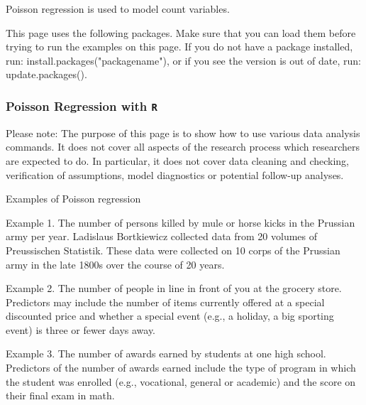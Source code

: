 \documentclass[00-GLMregslides.tex]{subfiles}
\begin{document}
\begin{frame}

Poisson regression is used to model count variables.

This page uses the following packages. Make sure that you can load them before trying to run the examples on this page. 
If you do not have a package installed, run: install.packages("packagename"), or if you see the version is out of date, run: update.packages().
 


% 
\end{frame}

\begin{frame}[fragile]

\frametitle{Poisson Regression with \texttt{R}}
\Large 
Please note: The purpose of this page is to show how to use various data analysis commands. It does not cover all aspects of the research process which researchers are expected to do. In particular, it does not cover data cleaning and checking, verification of assumptions, model diagnostics or potential follow-up analyses.
\end{frame}

\begin{frame}[fragile]
Examples of Poisson regression

Example 1. The number of persons killed by mule or horse kicks in the Prussian army per year. Ladislaus Bortkiewicz collected data from 20 volumes of Preussischen Statistik. These data were collected on 10 corps of the Prussian army in the late 1800s over the course of 20 years.
 
Example 2. The number of people in line in front of you at the grocery store. Predictors may include the number of items currently offered at a special discounted price and whether a special event (e.g., a holiday, a big sporting event) is three or fewer days away.
 
Example 3. The number of awards earned by students at one high school. Predictors of the number of awards earned include the type of program in which the student was enrolled (e.g., vocational, general or academic) and the score on their final exam in math.
\end{frame}
\end{document}
